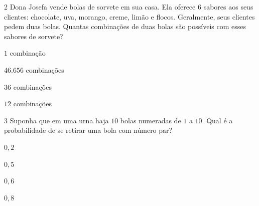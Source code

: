 
\num{2}  Dona Josefa vende bolas de sorvete em sua casa. Ela oferece $6$ sabores
aos seus clientes: chocolate, uva, morango, creme, limão e flocos.
Geralmente, seus clientes pedem duas bolas. Quantas combinações de duas
bolas são possíveis com esses sabores de sorvete?

\begin{escolha}
\item $1$ combinação
\item $46.656$ combinações
\item $36$ combinações
\item $12$ combinações
\end{escolha}



\num{3}  Suponha que em uma urna haja $10$ bolas numeradas de $1$ a $10$. Qual é a
probabilidade de se retirar uma bola com número par?

\begin{escolha}
\item $0,2$
\item $0,5$
\item $0,6$
\item $0,8$
\end{escolha}

